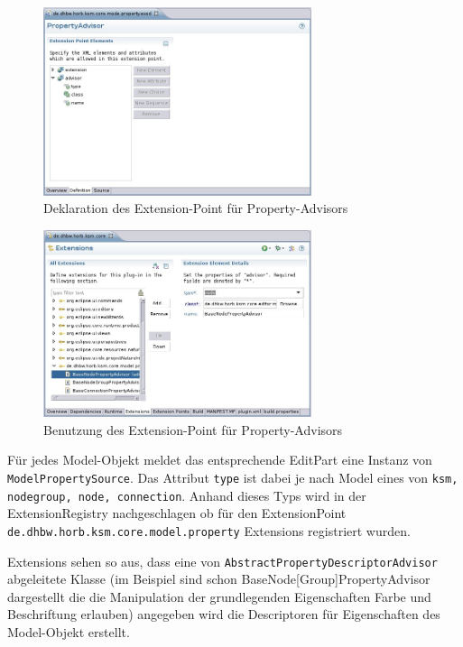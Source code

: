 \documentclass[%
12pt,titlepage,abstracton,DIV=10]{scrreprt}
\begin{document}
\begin{figure}[ht]
\centering
\includegraphics[width=0.7\textwidth]{images/eclipse-property-declaration-extensionpoint.jpg}
\caption{Deklaration des Extension-Point für Property-Advisors}
\label{fig:property-declaration-extensionpoint}
\end{figure}

\begin{figure}[ht!]
\centering
\includegraphics[width=0.7\textwidth]{images/eclipse-property-usage-extensionpoint.jpg}
\caption{Benutzung des Extension-Point für Property-Advisors}
\label{fig:eclipse-property-usage-extensionpoint}
\end{figure}

Für jedes Model-Objekt meldet das entsprechende EditPart eine Instanz von
\texttt{Model\-Property\-Source}. Das Attribut \texttt{type} ist dabei je nach
Model eines von \texttt{ksm, node\-group, node, con\-nection}.
Anhand dieses Typs wird in der Extension\-Registry nachgeschlagen ob für den
Extension\-Point \texttt{de.\-dhbw.\-horb.\-ksm.\-core.\-model.\-property}
Extensions registriert wurden.

Extensions sehen so aus, dass eine von
\texttt{Abstract\-Property\-Descriptor\-Advisor} abgeleitete Klasse (im
Beispiel sind schon BaseNode[Group]PropertyAdvisor dargestellt die die
Manipulation der grundlegenden Eigenschaften Farbe und Beschriftung erlauben)
angegeben wird die Descriptoren für Eigenschaften des Model-Objekt erstellt.
\end{document}
